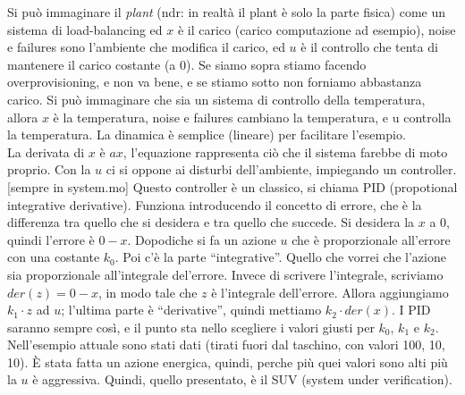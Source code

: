 \documentclass[a4paper, 11pt]{article}
\begin{document}
Si può immaginare il \emph{plant} (ndr: in realtà il plant è solo la parte fisica) come un sistema di load-balancing ed $x$ è il carico (carico computazione ad esempio), noise e failures sono l'ambiente che modifica il carico, ed $u$ è il controllo che tenta di mantenere il carico costante (a 0). Se siamo sopra stiamo facendo overprovisioning, e non va bene, e se stiamo sotto non forniamo abbastanza carico. Si può immaginare che sia un sistema di controllo della temperatura, allora $x$ è la temperatura, noise e failures cambiano la temperatura, e u controlla la temperatura. La dinamica è semplice (lineare) per facilitare l'esempio.\\
La derivata di $x$ è $ax$, l'equazione rappresenta ciò che il sistema farebbe di moto proprio. Con la $u$ ci si oppone ai disturbi dell'ambiente, impiegando un controller. [sempre in system.mo] Questo controller è un classico, si chiama PID (propotional integrative derivative). Funziona introducendo il concetto di errore, che è la differenza tra quello che si desidera e tra quello che succede. Si desidera la $x$ a 0, quindi l'errore è $0 - x$. Dopodiche si fa un azione $u$ che è proporzionale all'errore con una costante $k_0$. Poi c'è la parte ``integrative''. Quello che vorrei che l'azione sia proporzionale all'integrale del'errore. Invece di scrivere l'integrale, scriviamo $der(z) = 0 - x$, in modo tale che $z$ è l'integrale dell'errore. Allora aggiungiamo $k_1 \cdot z$ ad $u$; l'ultima parte è ``derivative'', quindi mettiamo $k_2 \cdot der(x)$. I PID saranno sempre così, e il punto sta nello scegliere i valori giusti per $k_0$, $k_1$ e $k_2$. Nell'esempio attuale sono stati dati (tirati fuori dal taschino, con valori 100, 10, 10). \`E stata fatta un azione energica, quindi, perche più quei valori sono alti più la $u$ è aggressiva. Quindi, quello presentato, è il SUV (system under verification).\\
\end{document}
